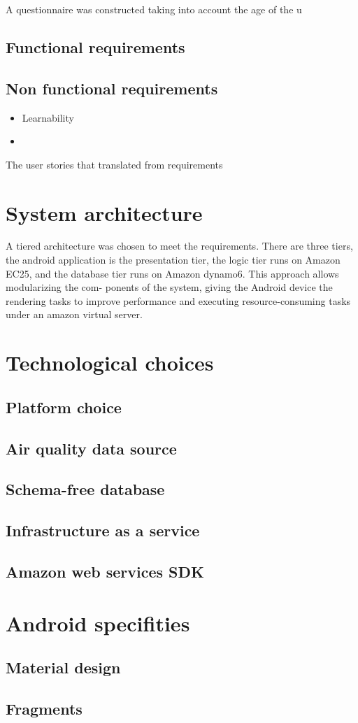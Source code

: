 A questionnaire was constructed taking into account the age of the u


\subsection{Functional requirements}



\subsection{Non functional requirements}

\begin{itemize}
	\item Learnability
    \item 
\end{itemize}

The user stories that translated from requirements
\section{System architecture}
A tiered architecture was chosen to meet the requirements. There are three tiers, the android application is the presentation tier,
the logic tier runs on Amazon EC25, and the database tier runs on Amazon dynamo6. This approach allows modularizing the com- ponents of the system, giving the Android device the rendering tasks to improve performance and executing resource-consuming tasks under an amazon virtual server.

\section{Technological choices}
\subsection{Platform choice}
\subsection{Air quality data source}
\subsection{Schema-free database}
\subsection{Infrastructure as a service}
\subsection{Amazon web services SDK}
\section{Android specifities}
\subsection{Material design}
\subsection{Fragments}